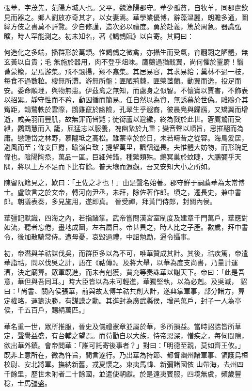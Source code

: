 \begin{pinyinscope}
 張華，字茂先，范陽方城人也。父平，魏漁陽郡守。華少孤貧，自牧羊，同郡盧欽見而器之。鄉人劉放亦奇其才，以女妻焉。華學業優博，辭藻溫麗，朗贍多通，圖緯方伎之書莫不詳覽。少自修謹，造次必以禮度。勇於赴義，篤於周急。器識弘曠，時人罕能測之。初未知名，著《鷦鷯賦》以自寄。其詞曰：



 何造化之多端，播群形於萬類。惟鷦鷯之微禽，亦攝生而受氣，育翩翾之陋體，無玄黃以自貴；毛
 無施於器用，肉不登乎俎味。鷹鸇過猶戢翼，尚何懼於罿罻！翳薈蒙籠，是焉游集。飛不飄揚，翔不翕集。其居易容，其求易給；巢林不過一枝，每食不過數粒。棲無所滯。游無所盤；匪陋荊棘，匪榮茝蘭。動翼而逸，投足而安。委命順理，與物無患。伊茲禽之無知，而處身之似智。不懷寶以賈害，不飾表以招累。靜守性而不矜，動因循而簡易。任自然以為資，無誘慕於世偽。雕鶡介其觜距，鵠鷺軼於雲際，鵾雞竄於幽險，孔翠生乎遐裔，彼晨鳧與歸鴈，又矯翼而增逝，咸美羽而豐肌，故無罪而皆斃；徒銜蘆以避繳，終為戮於此世。蒼鷹鷙而受紲，鸚鵡慧而入
 籠，屈猛志以服養，塊幽縶於九重；變音聲以順旨，思摧翮而為庸。戀鍾岱之林野，慕隴坻之高松。雖蒙幸於於日，未若疇昔之從容。海鳥爰居，避風而至；條支巨爵，踰嶺自致；提挈萬里，飄颻逼畏。夫惟體大妨物，而形瑰足偉也。陰陽陶烝，萬品一區。巨細舛錯，種繁類殊。鷦冥巢於蚊睫，大鵬彌乎天隅，將以上方不足而下比有餘。普天壤而遐觀，吾又安知大小之所如。



 陳留阮籍見之，歎曰：「王佐之才也！」由是聲名始著。郡守鮮于嗣薦華為太常博士。盧欽言之於文帝，轉河南尹丞，未拜，除佐著作郎。頃之，遷長史，兼中書郎。朝議表奏，多見施用，遂即真。
 晉受禪，拜黃門侍郎，封關內侯。



 華彊記默識，四海之內，若指諸掌。武帝嘗問漢宮室制度及建章千門萬戶，華應對如流，聽者忘倦，畫地成圖，左右屬目。帝甚異之，時人比之子產。數歲，拜中書令，後加散騎常侍。遭母憂，哀毀過禮，中詔勉勵，逼令攝事。



 初，帝潛與羊祜謀伐吳，而群臣多以為不可，唯華贊成其計。其後，祜疾篤，帝遣華詣祜，問以伐吳之計，語在《祜傳》。及將大舉，以華為度支尚書，乃量計運漕，決定廟算。眾軍既進，而未有剋獲，賈充等奏誅華以謝天下。帝曰：「此是吾意，華但與吾同耳。」時大臣皆以為未可輕進，華獨堅執，以為必剋。及吳滅，
 詔曰：「尚書、關內侯張華，前與故太傅羊祜共創大計，遂典掌軍事，部分諸方，算定權略，運籌決勝，有謀謨之勳。其進封為廣武縣侯，增邑萬戶，封子一人為亭侯，千五百戶，賜絹萬匹。」



 華名重一世，眾所推服，晉史及儀禮憲章並屬於華，多所損益。當時詔誥皆所草定，聲譽益盛，有台輔之望焉。而荀勖自以大族，恃帝恩深，憎疾之，每伺間隙，欲出華外鎮。會帝問華：「誰可託寄後事者？」對曰：「明德至親，莫如齊王攸。」既非上意所在，微為忤旨，間言遂行。乃出華為持節、都督幽州諸軍事、領護烏桓校尉、安北將軍。撫納新舊，戎夏懷之。東夷馬韓、新彌諸國依
 山帶海，去州四千餘里，歷世未附者二十餘國，並遣使朝獻。於是遠夷賓服，四境無虞，頻歲豐稔，士馬彊盛。




\end{pinyinscope}
